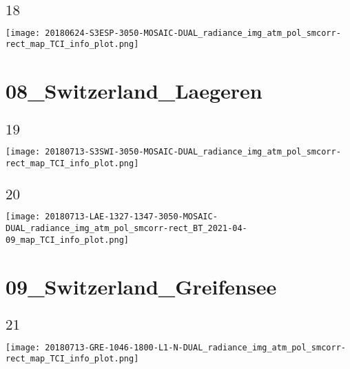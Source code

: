 \documentclass[9pt]{beamer}
\begin{document}
\subsection{$18$}
\begin{frame}
\begin{center}
\texttt{[image: 20180624-S3ESP-3050-MOSAIC-DUAL\_radiance\_img\_atm\_pol\_smcorr-rect\_map\_TCI\_info\_plot.png]}
\end{center}
\end{frame}
\section{08\_Switzerland\_Laegeren}

\subsection{$19$}
\begin{frame}
\begin{center}
\texttt{[image: 20180713-S3SWI-3050-MOSAIC-DUAL\_radiance\_img\_atm\_pol\_smcorr-rect\_map\_TCI\_info\_plot.png]}
\end{center}
\end{frame}

\subsection{$20$}
\begin{frame}
\begin{center}
\texttt{[image: 20180713-LAE-1327-1347-3050-MOSAIC-DUAL\_radiance\_img\_atm\_pol\_smcorr-rect\_BT\_2021-04-09\_map\_TCI\_info\_plot.png]}
\end{center}
\end{frame}
\section{09\_Switzerland\_Greifensee}

\subsection{$21$}
\begin{frame}
\begin{center}
\texttt{[image: 20180713-GRE-1046-1800-L1-N-DUAL\_radiance\_img\_atm\_pol\_smcorr-rect\_map\_TCI\_info\_plot.png]}
\end{center}
\end{frame}
\end{document}
